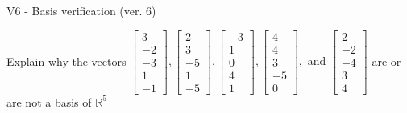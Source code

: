 \begin{exercise}
  \begin{exerciseTitle}V6 - Basis verification (ver. 6)\end{exerciseTitle}
  \begin{exerciseStatement}
    Explain why the vectors \(\left[\begin{array}{r}
3 \\
-2 \\
-3 \\
1 \\
-1
\end{array}\right] , \left[\begin{array}{r}
2 \\
3 \\
-5 \\
1 \\
-5
\end{array}\right] , \left[\begin{array}{r}
-3 \\
1 \\
0 \\
4 \\
1
\end{array}\right] , \left[\begin{array}{r}
4 \\
4 \\
3 \\
-5 \\
0
\end{array}\right] , \text{ and } \left[\begin{array}{r}
2 \\
-2 \\
-4 \\
3 \\
4
\end{array}\right]\) are or are not a basis of \(\mathbb{R}^5\)	



\end{exerciseStatement}
\end{exercise}
